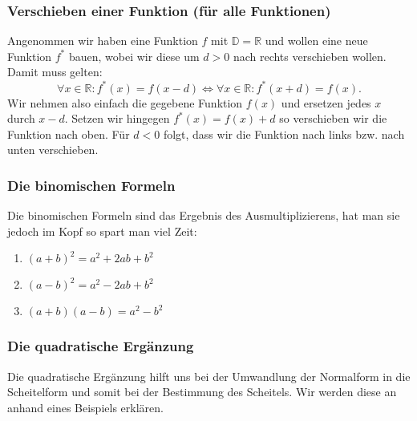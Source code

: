 \subsubsection{Verschieben einer Funktion (für alle Funktionen)} \label{sec:verschieben}
Angenommen wir haben eine Funktion $f$ mit $\mathbb{D} = \mathbb{R}$ und wollen eine neue Funktion $f^*$ bauen, wobei wir diese um $d > 0$ nach rechts verschieben wollen. Damit muss gelten:
\begin{equation*}
\forall x \in \mathbb{R} :  f^*(x) = f(x-d) \iff \forall x \in \mathbb{R} : f^*(x+d) = f(x).
\end{equation*}
Wir nehmen also einfach die gegebene Funktion $f(x)$ und ersetzen jedes $x$ durch $x-d$. Setzen wir hingegen $f^*(x) = f(x) + d$ so verschieben wir die Funktion nach oben. Für $d < 0$ folgt, dass wir die Funktion nach links bzw. nach unten verschieben.

\subsubsection{Die binomischen Formeln}
Die binomischen Formeln sind das Ergebnis des Ausmultiplizierens, hat man sie jedoch im Kopf so spart man viel Zeit:
\begin{enumerate}
\item $(a+b)^2=a^2+2ab+b^2$
\item $(a-b)^2=a^2-2ab+b^2$
\item $(a+b)(a-b)=a^2-b^2$
\end{enumerate}

\subsubsection{Die quadratische Ergänzung}
Die quadratische Ergänzung hilft uns bei der Umwandlung der Normalform in die Scheitelform und somit bei der Bestimmung des Scheitels. Wir werden diese an anhand eines Beispiels erklären.


